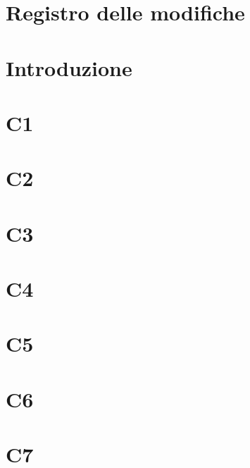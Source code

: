 \documentclass[a4paper, oneside, openany, dvipsnames, table]{article}
\begin{document}
\copertina{}

\section*{Registro delle modifiche}\label{sec:Registro-modifiche}


\newpage
\tableofcontents

\newpage
\section{Introduzione}\label{sec:Introduzione}


\newpage
\section{C1}\label{sec:C1}


\newpage
\section{C2}\label{sec:C2}


\newpage
\section{C3}\label{sec:C3}


\newpage
\section{C4}\label{sec:C4}


\newpage
\section{C5}\label{sec:C5}


\newpage
\section{C6}\label{sec:C6}


\newpage
\section{C7}\label{sec:C7}

\end{document}
